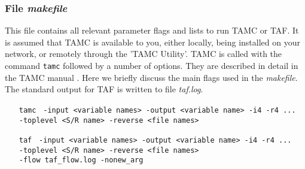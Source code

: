 \subsubsection{File {\it makefile}}
\label{www:tutorials}

This file contains all relevant parameter flags and
lists to run TAMC or TAF.
It is assumed that TAMC is available to you, either locally,
being installed on your network, or remotely through the 'TAMC Utility'.
TAMC is called with the command {\tt tamc} followed by a
number of options. They are described in detail in the
TAMC manual \cite{gie:99}.
Here we briefly discuss the main flags used in the {\it makefile}.
The standard output for TAF is written to file
{\it taf.log}.
%
\begin{itemize}
\item [{\tt tamc}] {\tt
-input <variable names>
-output <variable name> -i4 -r4 ... \\
-toplevel <S/R name> -reverse <file names> 
}
\item [{\tt taf}] {\tt
-input <variable names>
-output <variable name> -i4 -r4 ... \\
-toplevel <S/R name> -reverse <file names> \\
-flow taf\_flow.log -nonew\_arg
}
\end{itemize}
%
